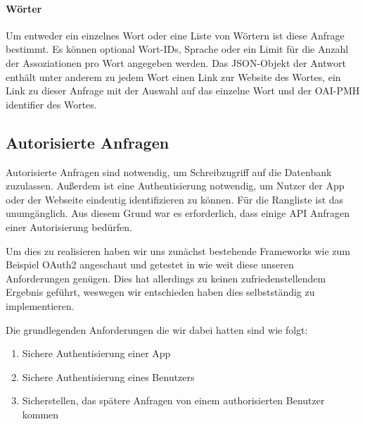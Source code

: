 \paragraph{Wörter} Um entweder ein einzelnes Wort oder eine Liste von Wörtern ist diese Anfrage bestimmt. Es können optional Wort-IDs, Sprache oder ein Limit für die Anzahl der Assoziationen pro Wort angegeben werden. Das JSON-Objekt der Antwort enthält unter anderem zu jedem Wort einen Link zur Website des Wortes, ein Link zu dieser Anfrage mit der Auswahl auf das einzelne Wort und der OAI-PMH identifier des Wortes.

\subsection{Autorisierte Anfragen}\label{subsec:autorisierte_anfragen}
Autorisierte Anfragen sind notwendig, um Schreibzugriff auf die Datenbank zuzulassen. Außerdem ist eine Authentisierung notwendig, um Nutzer der App oder der Webseite eindeutig identifizieren zu können. Für die Rangliste ist das unumgänglich. Aus diesem Grund war es erforderlich, dass einige API Anfragen einer Autorisierung bedürfen.

Um dies zu realisieren haben wir uns zunächst bestehende Frameworks wie zum Beispiel OAuth2 angeschaut und getestet in wie weit diese unseren Anforderungen genügen. Dies hat allerdings zu keinen zufriedenstellendem Ergebnis geführt, weswegen wir entschieden haben dies selbstständig zu implementieren.

Die grundlegenden Anforderungen die wir dabei hatten sind wie folgt:
\begin{enumerate}
	\item Sichere Authentisierung einer App
	\item Sichere Authentisierung eines Benutzers
	\item Sicherstellen, das spätere Anfragen von einem authorisierten Benutzer kommen
\end{enumerate}

